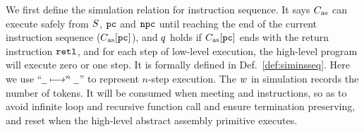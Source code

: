 We first define the simulation relation for
instruction sequence.
It says $C_{\text{as}}$ can execute safely
from $S$, $\texttt{pc}$ and $\texttt{npc}$ until reaching
the end of the current instruction sequence ($C_{\text{as}}[\texttt{pc}]$),
and $q$ holds if $C_{\text{as}}[\texttt{pc}]$ ends with the return
instruction $\texttt{retl}{}$, and for each step of low-level
execution, the high-level program will execute zero or
one step.
It is formally defined in Def.~\ref{def:siminsseq}.
Here we use ``$\underline{\ \,} \longmapsto^{n} \underline{\ \,}$'' to
represent $n$-step execution.
The $w$ in simulation records the number of tokens.
It will be consumed when meeting \jmp{} and \call{}
instructions, so as to avoid infinite loop and recursive
function call and ensure termination preserving, 
and reset when the high-level
abstract assembly primitive executes.

